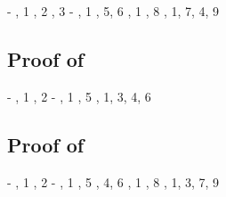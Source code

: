 \begin{derivation}
     {\hyp}
     {\Renega, 1}
     {\Rcxaxmono, 2}
     {\Refalse, 3}
     {\hyp}
     {\Rcxaxmono, 1}
     {, 5, 6}
\step{\cxwfO}
     {, 1}
\step{\istyO{\bool}}
     {\Rtbool, 8}
     {\Reif, 1, 7, 4, 9}
\end{derivation}



\subsection*{Proof of }

\begin{derivation}
     {\hyp}
     {\Rcxaxmono, 1}
     {\Retrue, 2}
     {\hyp}
\step{\cxwfO}
     {, 1}
\step{\istyO{\bool}}
     {\Rtbool, 5}
     {\Reif, 1, 3, 4, 6}
\end{derivation}



\subsection*{Proof of }

\begin{derivation}
     {\hyp}
     {\Rcxaxmono, 1}
     {\Retrue, 2}
     {\hyp}
     {\Renega, 1}
     {\Rcxaxmono, 5}
     {, 4, 6}
\step{\cxwfO}
     {, 1}
\step{\istyO{\bool}}
     {\Rtbool, 8}
     {\Reif, 1, 3, 7, 9}
\end{derivation}



